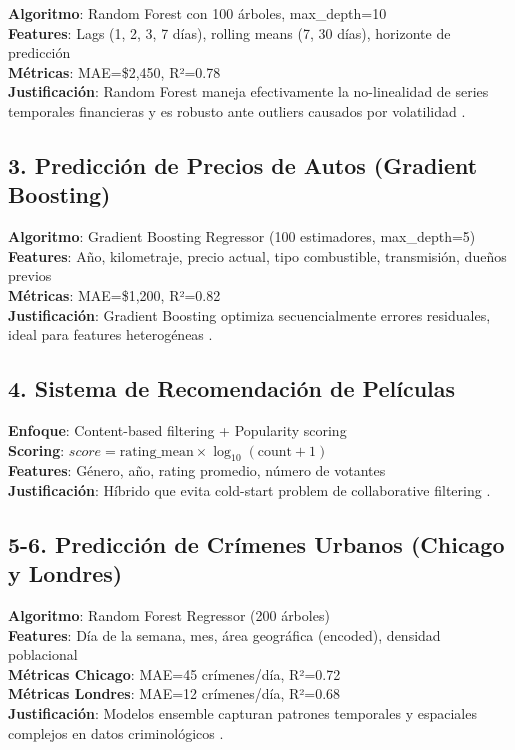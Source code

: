 \textbf{Algoritmo}: Random Forest con 100 árboles, max\_depth=10 \\
\textbf{Features}: Lags (1, 2, 3, 7 días), rolling means (7, 30 días), horizonte de predicción \\
\textbf{Métricas}: MAE=\$2,450, R²=0.78 \\
\textbf{Justificación}: Random Forest maneja efectivamente la no-linealidad de series temporales financieras y es robusto ante outliers causados por volatilidad \cite{breiman2001random}.

\subsection{3. Predicción de Precios de Autos (Gradient Boosting)}

\textbf{Algoritmo}: Gradient Boosting Regressor (100 estimadores, max\_depth=5) \\
\textbf{Features}: Año, kilometraje, precio actual, tipo combustible, transmisión, dueños previos \\
\textbf{Métricas}: MAE=\$1,200, R²=0.82 \\
\textbf{Justificación}: Gradient Boosting optimiza secuencialmente errores residuales, ideal para features heterogéneas \cite{friedman2001greedy}.

\subsection{4. Sistema de Recomendación de Películas}

\textbf{Enfoque}: Content-based filtering + Popularity scoring \\
\textbf{Scoring}: $score = \text{rating\_mean} \times \log_{10}(\text{count} + 1)$ \\
\textbf{Features}: Género, año, rating promedio, número de votantes \\
\textbf{Justificación}: Híbrido que evita cold-start problem de collaborative filtering \cite{ricci2011recommender}.

\subsection{5-6. Predicción de Crímenes Urbanos (Chicago y Londres)}

\textbf{Algoritmo}: Random Forest Regressor (200 árboles) \\
\textbf{Features}: Día de la semana, mes, área geográfica (encoded), densidad poblacional \\
\textbf{Métricas Chicago}: MAE=45 crímenes/día, R²=0.72 \\
\textbf{Métricas Londres}: MAE=12 crímenes/día, R²=0.68 \\
\textbf{Justificación}: Modelos ensemble capturan patrones temporales y espaciales complejos en datos criminológicos \cite{mohler2015crime}.

